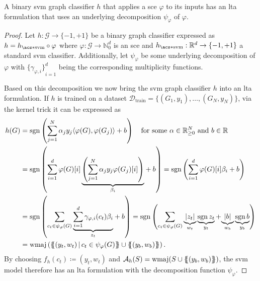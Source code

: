 \begin{thm}\label{thm:ltag:svm-ltag-formulation}
	A binary \ac{svm} graph classifier $h$ that applies a \ac{sce} $\varphi$ to its inputs has an \ac{lta} formulation that uses an underlying decomposition $\psi_{\varphi}$ of $\varphi$.
\end{thm}
\begin{proof}
	Let $h: \mathcal{G} \to {\{ -1, +1 \}}$ be a binary graph classifier expressed as $h = h_{\mathrm{\acs*{svm}}} \circ \varphi$ where $\varphi: \mathcal{G} \to \mathbb{N}_0^{d}$ is an \ac{sce} and $h_{\mathrm{\acs*{svm}}}: \mathbb{R}^{d} \to {\{ -1, +1 \}}$ a standard \ac{svm} classifier.
	Additionally, let $\psi_{\varphi}$ be some underlying decomposition of $\varphi$ with ${\{ \gamma_{\varphi, i} \}}_{i=1}^d$ being the corresponding multiplicity functions.

	Based on this decomposition we now bring the \ac{svm} graph classifier $h$ into an \ac{lta} formulation.
	If $h$ is trained on a dataset $\mathcal{D}_{\mathrm{train}} = {\{ (G_1, y_1), \dots, (G_N, y_N) \}}$, via the kernel trick it can be expressed as
	\begin{align*}
		h(G) &= \sgn\left( \sum_{j = 1}^{N} \alpha_j y_j {\langle \varphi(G), \varphi(G_j) \rangle} + b \right)
		\quad\text{for some $\alpha \in \mathbb{R}_{\geq 0}^N$ and $b \in \mathbb{R}$} \\
		&= \sgn\left( {\sum_{i=1}^{d} {
				\varphi(G)[i]
				\underbrace{\left( \sum_{j = 1}^{N} \alpha_j y_j {\varphi(G_j)}[i] \right)}_{\beta_i}}
			} + b \right)
		 = \sgn\left( {\sum_{i=1}^{d} \varphi(G)[i] \beta_i} + b \right) \\
		&= \sgn\left( {\sum_{c_t \in \psi_{\varphi}(G)} \underbrace{\sum_{i = 1}^d \gamma_{\varphi, i}(c_t) \beta_i}_{z_t}} + b \right)
		 = \sgn\left( {\sum_{c_t \in \psi_{\varphi}(G)}} \underbrace{|z_t|}_{w_t} \underbrace{\sgn{z_t}}_{y_t} + {\underbrace{|b|}_{w_b} \underbrace{\sgn{b}}_{y_b}} \right) \\
		&= \wmaj\left( \ldblbrace (y_t, w_t)\, |\, c_t \in \psi_{\varphi}(G) \rdblbrace \cup \ldblbrace (y_b, w_b) \rdblbrace \right)
		\text{.}
	\end{align*}
	By choosing $f_h(c_t) \coloneqq (y_t, w_t)$ and $\mathcal{A}_h(S) = \wmaj(S \cup \ldblbrace (y_b, w_b) \rdblbrace)$, the \ac{svm} model therefore has an \ac{lta} formulation with the decomposition function $\psi_{\varphi}$.


\end{proof}
